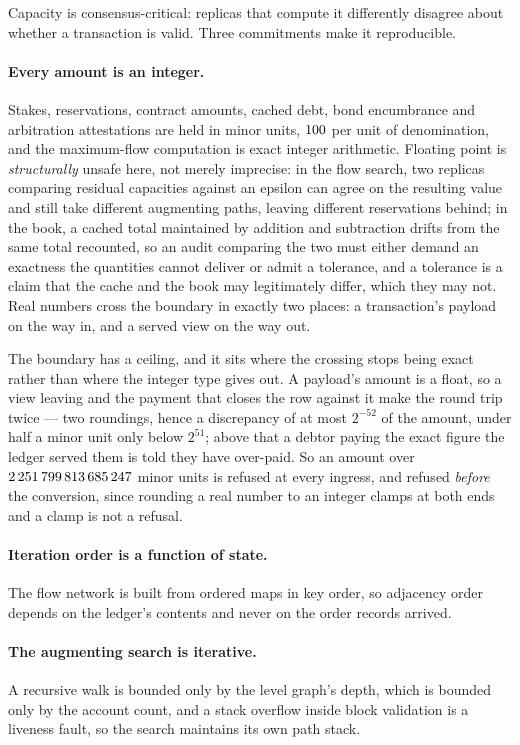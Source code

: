 Capacity is consensus-critical: replicas that compute it differently disagree about
whether a transaction is valid. Three commitments make it reproducible.

\paragraph{Every amount is an integer.} Stakes, reservations, contract amounts, cached
debt, bond encumbrance and arbitration attestations are held in minor units,
$100$ per unit of denomination, and the maximum-flow computation is exact
integer arithmetic. Floating point is \emph{structurally} unsafe here, not merely
imprecise: in the flow search, two replicas comparing residual capacities against an
epsilon can agree on the resulting value and still take different augmenting paths,
leaving different reservations behind; in the book, a cached total maintained by addition
and subtraction drifts from the same total recounted, so an audit comparing the two must
either demand an exactness the quantities cannot deliver or admit a tolerance, and a
tolerance is a claim that the cache and the book may legitimately differ, which they may
not. Real numbers cross the boundary in exactly two places: a transaction's payload on the
way in, and a served view on the way out.

The boundary has a ceiling, and it sits where the crossing stops being exact rather than
where the integer type gives out. A payload's amount is a float, so a view leaving and the
payment that closes the row against it make the round trip twice --- two roundings, hence
a discrepancy of at most $2^{-52}$ of the amount, under half a minor unit only below
$2^{51}$; above that a debtor paying the exact figure the ledger served them is told they
have over-paid. So an amount over $2\,251\,799\,813\,685\,247$ minor units is refused at every
ingress, and refused \emph{before} the conversion, since rounding a real number to an
integer clamps at both ends and a clamp is not a refusal.

\paragraph{Iteration order is a function of state.} The flow network is built from
ordered maps in key order, so adjacency order depends on the ledger's contents and never
on the order records arrived.

\paragraph{The augmenting search is iterative.} A recursive walk is bounded only by the
level graph's depth, which is bounded only by the account count, and a stack overflow
inside block validation is a liveness fault, so the search maintains its own path stack.

